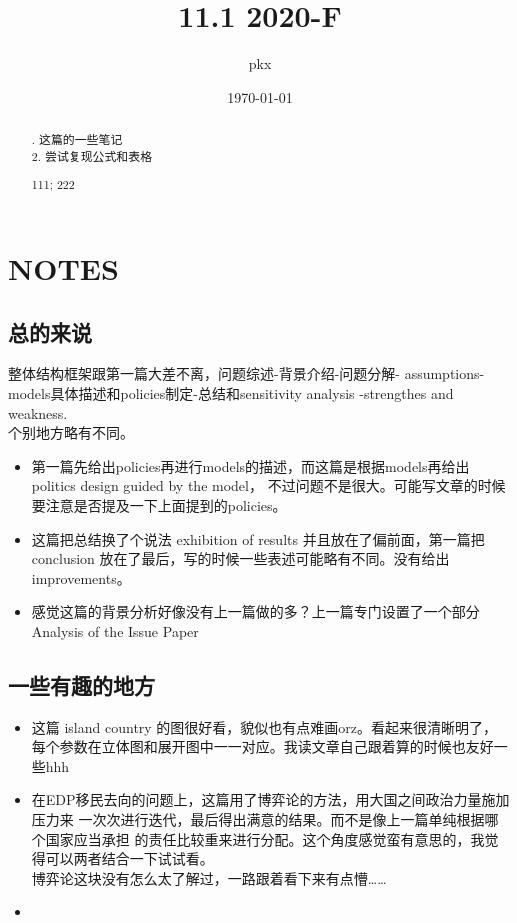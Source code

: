 \documentclass{mcmthesis}
\title{11.1   2020-F}
\author{pkx}
\date{\today}
\begin{document}
\begin{abstract}   %

  \setlength{\baselineskip}{20pt}   %
. 这篇的一些笔记  \\
2. 尝试复现公式和表格  \\ 

\begin{keywords}
111; 222
\end{keywords}
\end{abstract}
\maketitle

\tableofcontents   %

\clearpage   %

\section{NOTES}
\subsection{总的来说}

\indent\setlength{\parindent}{2em}
\setlength{\baselineskip}{20pt}   %
  整体结构框架跟第一篇大差不离，问题综述-背景介绍-问题分解-
  assumptions-models具体描述和policies制定-总结和sensitivity
   analysis  -strengthes and weakness. \\
\indent\setlength{\parindent}{2em}个别地方略有不同。

\begin{itemize}   %
\item 第一篇先给出policies再进行models的描述，而这篇是根据models再给出politics design guided by the model，
      不过问题不是很大。可能写文章的时候要注意是否提及一下上面提到的policies。
\item 这篇把总结换了个说法 exhibition of results 并且放在了偏前面，第一篇把 conclusion 放在了最后，写的时候一些表述可能略有不同。没有给出improvements。
\item 感觉这篇的背景分析好像没有上一篇做的多？上一篇专门设置了一个部分
      Analysis of the Issue Paper
\end{itemize}

\subsection{一些有趣的地方}
\begin{itemize}
  \item 这篇 island country 的图很好看，貌似也有点难画orz。看起来很清晰明了，
        每个参数在立体图和展开图中一一对应。我读文章自己跟着算的时候也友好一些hhh
  \item 在EDP移民去向的问题上，这篇用了博弈论的方法，用大国之间政治力量施加压力来
        一次次进行迭代，最后得出满意的结果。而不是像上一篇单纯根据哪个国家应当承担
        的责任比较重来进行分配。这个角度感觉蛮有意思的，我觉得可以两者结合一下试试看。\\
        博弈论这块没有怎么太了解过，一路跟着看下来有点懵……
  \item 
\end{itemize}
\end{document}
